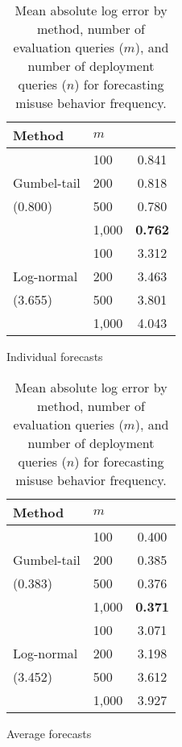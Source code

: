 \begin{table}[h!]
\centering
\begin{subtable}[b]{0.3\textwidth}
    \centering
    \begin{tabular}{llc}
    \toprule
    Method & $m$ & \\
    \midrule
     & 100 & 0.841 \\
     Gumbel-tail & 200 & 0.818 \\
     (0.800) & 500 & 0.780 \\
     & 1,000 & \textbf{0.762} \\
    \midrule
     & 100 & 3.312 \\
     Log-normal & 200 & 3.463 \\
     (3.655) & 500 & 3.801 \\
     & 1,000 & 4.043 \\
    \bottomrule
    \end{tabular}
    \caption{Individual forecasts}
\end{subtable}
\begin{subtable}[b]{0.3\textwidth}
    \centering
    \begin{tabular}{llc}
    \toprule
    Method & $m$ & \\
    \midrule
     & 100 & 0.400 \\
     Gumbel-tail & 200 & 0.385 \\
     (0.383) & 500 & 0.376 \\
     & 1,000 & \textbf{0.371} \\
    \midrule
     & 100 & 3.071 \\
     Log-normal & 200 & 3.198 \\
     (3.452) & 500 & 3.612 \\
     & 1,000 & 3.927 \\
    \bottomrule
    \end{tabular}
    \caption{Average forecasts}
\end{subtable}
\vspace{-1.5em}
\caption{Mean absolute log error by method, number of evaluation queries ($m$), and number of deployment queries ($n$) for forecasting misuse behavior frequency.}
\vspace{-0.5em}
\label{tab:misuse-behavior-frequency}
\end{table}